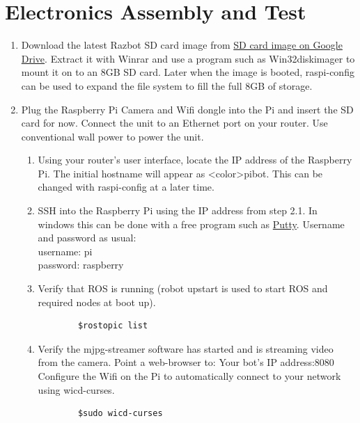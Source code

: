 \documentclass[12pt,titlepage,oneside]{memoir}
\begin{document}
\section{Electronics Assembly and Test}

\begin{enumerate}

\item Download the latest Razbot SD card image from \href{https://drive.google.com/file/d/0B4yfrdhk2e0OVlA1alJoRXBPeXM/view?usp=sharing}{SD card image on Google Drive}. Extract it with Winrar and use a program such as Win32diskimager to mount it on to an 8GB SD card. Later when the image is booted, raspi-config can be used to expand the file system to fill the full 8GB of storage.
\item Plug the Raspberry Pi Camera and Wifi dongle into the Pi and insert the SD card for now. Connect the unit to an Ethernet port on your router. Use conventional wall power to power the unit.
	\begin{enumerate}
	\item  Using your router's user interface, locate the IP address of the Raspberry Pi. The initial hostname will appear as <color>pibot. This can be changed with raspi-config at a later time.
	\item SSH into the Raspberry Pi using the IP address from step 2.1. In windows this can be done with a free program such as \href{http://www.chiark.greenend.org.uk/~sgtatham/putty/download.html}{Putty}. Username and 			password as usual:\\
	username: pi\\
	password: raspberry\\
	\item Verify that ROS is running (robot upstart is used to start ROS and required nodes at boot up).\\
	\begin{verbatim}
		$rostopic list
	\end{verbatim}
	\item Verify the mjpg-streamer software has started and is streaming video from the camera. Point a web-browser to: Your bot's IP address:8080
	Configure the Wifi on the Pi to automatically connect to your network using wicd-curses.
	\begin{verbatim}
		$sudo wicd-curses
	\end{verbatim}
	\end{enumerate}


\end{enumerate}
\end{document}
